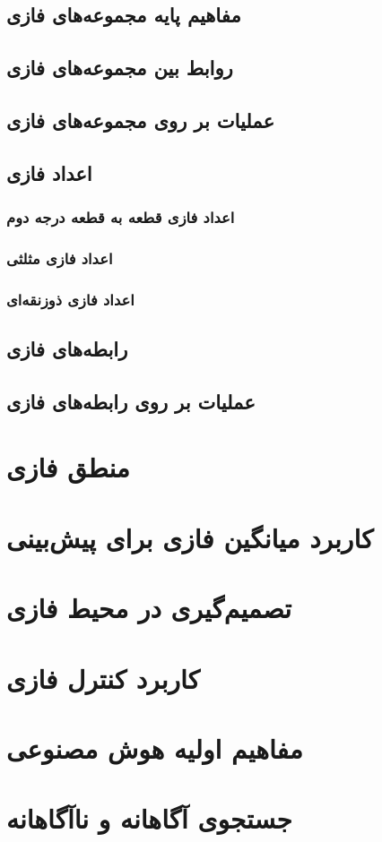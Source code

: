 \documentclass[12pt,a4paper]{article}
\begin{document}
 \subsection{ مفاهیم پایه مجموعه‌های فازی}
 \subsection{ روابط بین مجموعه‌های فازی}
 \subsection{عملیات بر روی مجموعه‌های فازی}
 \subsection{‌اعداد فازی}
  \subsubsection{ ‌اعداد فازی قطعه به قطعه درجه دوم}
  \subsubsection{‌اعداد فازی مثلثی}
  \subsubsection{‌اعداد فازی ذوزنقه‌ای}
 \subsection{رابطه‌های فازی}
 \subsection{عملیات بر روی رابطه‌های فازی}
\section{منطق فازی}
\section{کاربرد میانگین فازی برای پیش‌بینی}
\section{تصمیم‌گیری در محیط فازی}
\section{کاربرد کنترل فازی}
\section{مفاهیم اولیه هوش مصنوعی}
\section{جستجوی آگاهانه و ناآگاهانه}


\end{document}
